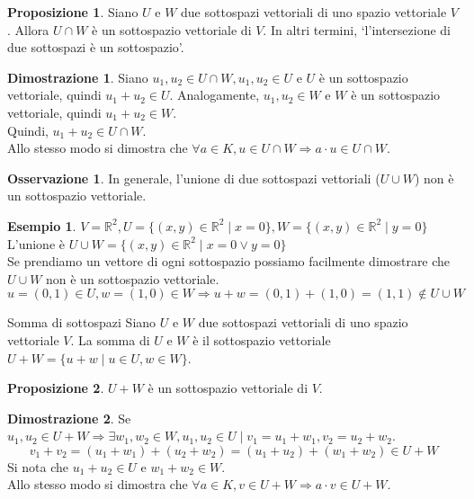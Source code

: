 \documentclass[a4paper]{article}
\theoremstyle{definition}
\newtheorem*{oss}{Osservazione}
\newtheorem*{dimm}{Dimostrazione}
\newtheorem*{es}{Esempio}
\newtheorem*{prop}{Proposizione}
\begin{document}
\begin{prop}
	Siano $U$ e $W$ due sottospazi vettoriali di uno spazio vettoriale $V$. Allora $U \cap W$ è un sottospazio vettoriale di $V$.
	In altri termini, \enquote*{l'intersezione di due sottospazi è un sottospazio}.
\end{prop}

\begin{dimm}
	Siano $u_1, u_2 \in U \cap W, u_1, u_2 \in U$ e $U$ è un sottospazio vettoriale, quindi $u_1 + u_2 \in U$.
	Analogamente, $u_1, u_2 \in W$ e $W$ è un sottospazio vettoriale, quindi $u_1 + u_2 \in W$. \\
	Quindi, $u_1 + u_2 \in U \cap W$. \\
	Allo stesso modo si dimostra che $\forall a \in K, u \in U \cap W \Rightarrow a \cdot u \in U \cap W$.
\end{dimm}

\begin{oss}
	In generale, l'unione di due sottospazi vettoriali ($U \cup W$) non è un sottospazio vettoriale.
\end{oss}
\begin{es}
	$V = \mathbb{R}^2, U = \{(x, y) \in \mathbb{R}^2 \mid x = 0\}, W = \{(x, y) \in \mathbb{R}^2 \mid y = 0\}$ \\
	L'unione è $U \cup W = \{(x, y) \in \mathbb{R}^2 \mid x = 0 \lor y = 0\}$ \\
	Se prendiamo un vettore di ogni sottospazio possiamo facilmente dimostrare che $U \cup W$ non è un sottospazio vettoriale.
	\[ u = (0, 1) \in U, w = (1, 0) \in W \Rightarrow u + w = (0, 1) + (1, 0) = (1, 1) \notin U \cup W \]
\end{es}

\begin{deff}{Somma di sottospazi}{}
	Siano $U$ e $W$ due sottospazi vettoriali di uno spazio vettoriale $V$.
	La somma di $U$ e $W$ è il sottospazio vettoriale $U + W = \{u + w \mid u \in U, w \in W\}$.
\end{deff}
\begin{prop}
	$U + W$ è un sottospazio vettoriale di $V$.
\end{prop}
\begin{dimm}
	Se $u_1, u_2 \in U + W \Rightarrow \exists w_1, w_2 \in W, u_1, u_2 \in U \mid v_1 = u_1 + w_1, v_2 = u_2 + w_2$.
	\[ v_1 + v_2 = (u_1 + w_1) + (u_2 + w_2) = (u_1 + u_2) + (w_1 + w_2) \in U + W \]
	Si nota che $u_1 + u_2 \in U$ e $w_1 + w_2 \in W$. \\
	Allo stesso modo si dimostra che $\forall a \in K, v \in U + W \Rightarrow a \cdot v \in U + W$.
\end{dimm}
\end{document}
